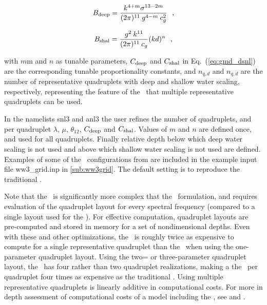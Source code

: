 \begin{equation}
B_{\rm{deep}} = \frac{k^{4+m} \sigma^{13-2m} }{(2\pi)^{11} \:
                 g^{4-m} \: c_g^2 } \:\:\: , \label{eq:gmd_B_deep}
\end{equation}

\begin{equation}
B_{\rm{shal}} = \frac{g^2 \: k^{11}}{(2\pi)^{11} \: c_g} (kd)^n
\:\:\: , \label{eq:gmd_B_shal}
\end{equation}

\noindent
with $m$m and $n$ as tunable parameters, $C_{\rm{deep}}$ and $C_{\rm{shal}}$
in Eq.~(\ref{eq:gmd_dsnl}) are the corresponding tunable proportionality
constants, and $n_{q,d}$ and $n_{q,d}$ are the number of representative
quadruplets with deep and shallow water scaling, respectively, representing
the feature of the \gmd\ that multiple representative quadruplets can be used.

In the namelists {\F snl3} and {\F anl3} the user refines the number of
quadruplets, and per quadruplet $\lambda$, $\mu$, $\theta_{12}$,
$C_{\rm{deep}}$ and $C_{\rm{shal}}$. Values of $m$ and $n$ are defined once,
and used for all quadruplets. Finally relative depth below which deep water
scaling is not used and above which shallow water scaling is not used are
defined. Examples of some of the \gmd\ configurations from \cite{tol:MMAB10d}
are included in the example input file {\file ww3\_grid.inp}
in \para\ref{sub:ww3grid}. The default setting is to reproduce the traditional
\dia.

Note that the \gmd\ is significantly more complex that the \dia\ formulation,
and requires evaluation of the quadruplet layout for every spectral frequency
(compared to a single layout used for the \dia). For effective computation,
quadruplet layouts are pre-computed and stored in memory for a set of
nondimensional depths. Even with these and other optimizations, the \gmd\ is
roughly twice as expensive to compute for a single representative quadruplet
than the \dia\ when using the one-parameter quadruplet layout. Using the two=
or three-parameter quadruplet layout, the \gmd\ has four rather than two
quadruplet realizations, making a the \gmd\ per quadruplet four times as
expensive as the traditional \dia. Using multiple representative quadruplets
is linearly additive in computational costs. For more in depth assessment of
computational costs of a model including the \gmd, see \cite{tol:MMAB10d} and
\cite{tol:OMOD13d}.
